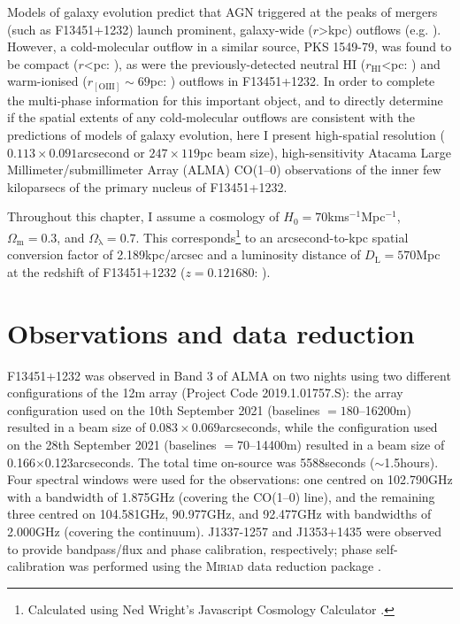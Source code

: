 Models of galaxy evolution predict that AGN triggered at the peaks of mergers (such as F13451+1232) launch prominent, galaxy-wide ($r$\;\textgreater{}\;kpc) outflows (e.g. \citealt{Springel2005, Hopkins2008, Johansson2009}). However, a cold-molecular outflow in a similar source, PKS 1549-79, was found to be compact ($r$\;\textless{}\;pc: \citealt{Oosterloo2019}), as were the previously-detected neutral HI ($r_\mathrm{HI}$\;\textless{}\;pc: \citealt{Morganti2013_4c1250}) and warm-ionised ($r_\mathrm{[OIII]}\sim69$\;pc: \citealt{Tadhunter2018}) outflows in F13451+1232. In order to complete the multi-phase information for this important object, and to directly determine if the spatial extents of any cold-molecular outflows are consistent with the predictions of models of galaxy evolution, here I present high-spatial resolution ($0.113\times0.091$\;arcsecond or $247\times119$\;pc beam size), high-sensitivity Atacama Large Millimeter/submillimeter Array (ALMA) CO(1--0) observations of the inner few kiloparsecs of the primary nucleus of F13451+1232.

Throughout this chapter, I assume a cosmology of $H_0=70$\;km\;s$^{-1}$\;Mpc$^{-1}$, $\Omega_\mathrm{m}=0.3$, and $\Omega_\mathrm{\lambda}=0.7$. This corresponds\footnote{Calculated using Ned Wright's Javascript Cosmology Calculator \citep{Wright2006}.} to an arcsecond-to-kpc spatial conversion factor of 2.189\;kpc/arcsec and a luminosity distance of $D_\mathrm{L}=570$\;Mpc at the redshift of F13451+1232 ($z=0.121680$: \citealt{Lamperti2022}).

\section{Observations and data reduction}
\label{section: alma_f13451_1232: observations_and_data_reduction}

F13451+1232 was observed in Band 3 of ALMA on two nights using two different configurations of the 12\;m array (Project Code 2019.1.01757.S): the array configuration used on the 10th September 2021 (baselines $=180$--16200\;m) resulted in a beam size of $0.083\times0.069$\;arcseconds, while the configuration used on the 28th September 2021  (baselines $=70$--14400\;m) resulted in a beam size of 0.166$\times$0.123\;arcseconds. The total time on-source was 5588\;seconds ($\sim$1.5\;hours). Four spectral windows were used for the observations: one centred on 102.790\;GHz with a bandwidth of 1.875\;GHz (covering the CO(1--0) line), and the remaining three centred on 104.581\;GHz, 90.977\;GHz, and 92.477\;GHz with bandwidths of 2.000\;GHz (covering the continuum). J1337-1257 and J1353+1435 were observed to provide bandpass/flux and phase calibration, respectively; phase self-calibration was performed using the \textsc{Miriad} data reduction package \citep{Sault1995}.

